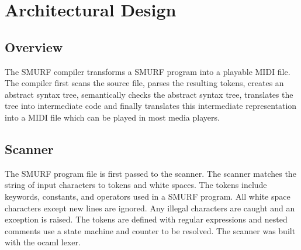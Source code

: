 \section{Architectural Design}

\subsection{Overview}
The SMURF compiler transforms a SMURF program into a playable MIDI file.
 The compiler first scans the source file, parses 
the resulting tokens, creates an abstract syntax tree, semantically 
checks the abstract syntax tree, translates the tree into 
intermediate code and finally translates this intermediate 
representation into a MIDI file which can be played in most 
media players. 



\subsection{Scanner}
The SMURF program file is first passed to the scanner. The scanner 
matches the string of input characters to tokens and white spaces.
The tokens include keywords, constants, and operators used in a SMURF 
program. All white space characters except new lines are ignored. 
Any illegal characters are caught 
and an exception is raised. The tokens are defined with regular 
expressions and nested comments use a state machine and counter 
to be resolved. The scanner was built with the ocaml lexer. 

